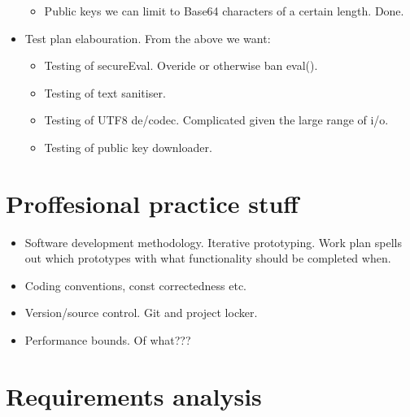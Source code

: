 \begin{itemize}
\begin{itemize}
                \item Public keys we can limit to Base64 characters of a certain length. Done.
            \end{itemize}
            \item Test plan elabouration. From the above we want:
            \begin{itemize}
                \item Testing of secureEval. Overide or otherwise ban eval().
                \item Testing of text sanitiser.
                \item Testing of UTF8 de/codec. Complicated given the large range of i/o.
                \item Testing of public key downloader.
            \end{itemize}
        \end{itemize}
    
   
\FloatBarrier 
\section{Proffesional practice stuff}
    \begin{itemize}
	\item Software development methodology. Iterative prototyping. Work plan spells out which prototypes with what functionality should be completed when.
        \item Coding conventions, const correctedness etc.
	\item Version/source control. Git and project locker.
	\item Performance bounds. Of what???
    \end{itemize}
    
\FloatBarrier
\section{Requirements analysis}
        
